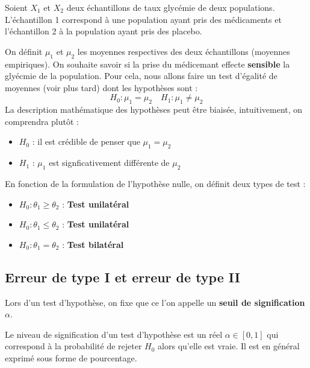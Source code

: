 \begin{example}
    Soient $X_1$ et $X_2$ deux échantillons de taux glycémie de deux populations. 
    L'échantillon 1 correspond à une population ayant pris des médicaments et l'échantillon 2 à la population ayant 
    pris des placebo. 

    On définit $\mu_1$ et $\mu_2$ les moyennes respectives des deux échantillons (moyennes empiriques). 
    On souhaite savoir si la prise du médicemant effecte \textbf{sensible} la glyécmie de la population. 
    Pour cela, nous allons faire un test d'égalité de moyennes (voir plus tard) dont les hypothèses sont : 
        \[ H_0 : \mu_1 = \mu_2 \quad H_1 : \mu_1 \not = \mu_2 \] 
    La description mathématique des hypothèses peut être biaisée, intuitivement, on comprendra plutôt :
    \begin{itemize}
        \item $H_0$ : il est crédible de penser que $\mu_1 = \mu_2$ 
        \item $H_1$ : $\mu_1$ est signficativement différente de $\mu_2$ 
    \end{itemize}
\end{example}

\begin{definition}
    En fonction de la formulation de l'hypothèse nulle, on définit deux types de test :
    \begin{itemize}
        \item $H_0 : \theta_1 \geqslant \theta_2$ : \textbf{Test unilatéral}
        \item $H_0 : \theta_1 \leqslant \theta_2$ : \textbf{Test unilatéral}
        \item $H_0 : \theta_1 = \theta_2$ : \textbf{Test bilatéral}
    \end{itemize}
\end{definition}


\subsection{Erreur de type I et erreur de type II}

Lors d'un test d'hypothèse, on fixe que ce l'on appelle un \textbf{seuil de signification $\alpha$}. 

\begin{definition}
    Le niveau de signification d'un test d'hypothèse est un réel $ \alpha \in [0,1]$ qui correspond 
    à la probabilité de rejeter $H_0$ alors qu'elle est vraie. Il est en général exprimé sous forme de pourcentage. 
\end{definition}

